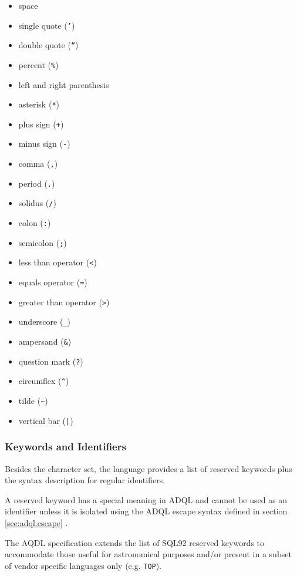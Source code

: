 \documentclass[11pt,a4paper]{ivoa}
\begin{document}
\begin{itemize}
    \item space
    \item single quote (\verb:’:)
    \item double quote (\verb:“:)
    \item percent (\verb:%:)
    \item left and right parenthesis
    \item asterisk (\verb:*:)
    \item plus sign (\verb:+:)
    \item minus sign (\verb:-:)
    \item comma (\verb:,:)
    \item period (\verb:.:)
    \item solidus (\verb:/:)
    \item colon (\verb.:.)
    \item semicolon (\verb:;:)
    \item less than operator (\verb:<:)
    \item equals operator (\verb:=:)
    \item greater than operator (\verb:>:)
    \item underscore (\verb:_:)
    \item ampersand (\verb:&:)
    \item question mark (\verb:?:)
    \item circumflex (\verb:^:)
    \item tilde (\verb:~:)
    \item vertical bar (\verb:|:)
\end{itemize}

\subsubsection{Keywords and Identifiers}
\label{sec:keywords}

Besides the character set, the language provides a list of reserved keywords
plus the syntax description for regular identifiers.

A reserved keyword has a special meaning in ADQL and cannot be used as
an identifier unless it is isolated using the ADQL escape syntax defined
in section \ref{sec:adql.escape} .

The AQDL specification extends the list of SQL92 reserved keywords to accommodate
those useful for astronomical purposes and/or present in a subset of vendor
specific languages only (e.g. \verb:TOP:).
\end{document}
